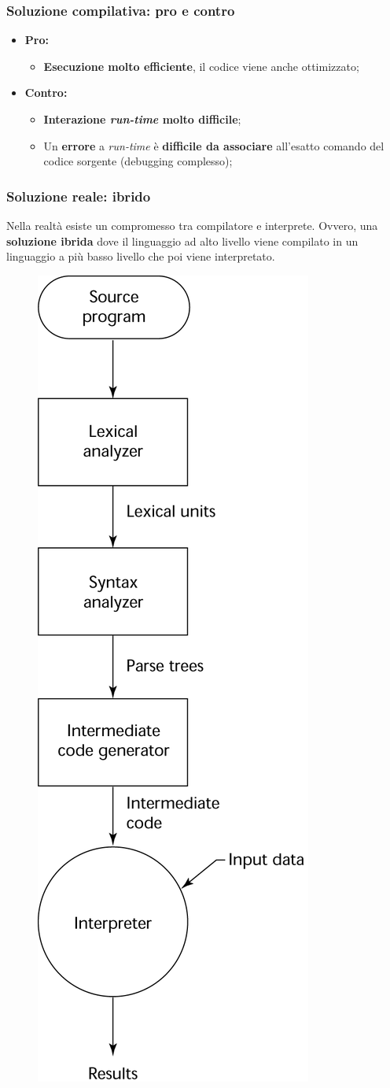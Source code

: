 \documentclass[a4paper]{article}
\begin{document}
	\subsubsection{Soluzione compilativa: pro e contro}
	
	\begin{itemize}
		\item \textcolor{Green4}{\textbf{Pro:}}
		\begin{itemize}
			\item \textbf{Esecuzione molto efficiente}, il codice viene anche ottimizzato;
		\end{itemize}

		\item \textcolor{Red3}{\textbf{Contro:}}
		\begin{itemize}
			\item \textbf{Interazione \emph{run-time} molto difficile};
			\item Un \textbf{errore} a \emph{run-time} è \textbf{difficile da associare} all'esatto comando del codice sorgente (debugging complesso);
		\end{itemize}
	\end{itemize}\newpage

	\subsubsection{Soluzione reale: ibrido}\label{ibrido}

	Nella realtà esiste un compromesso tra compilatore e interprete. Ovvero, una \textcolor{Red3}{\textbf{soluzione ibrida}} dove il linguaggio
	ad alto livello viene compilato in un linguaggio a più basso livello che poi viene interpretato.
	\begin{figure}[!htp]
		\centering
		\includegraphics[width=.3\textwidth]{img/soluzione_reale_ibrida.png}
	\end{figure}
\end{document}
